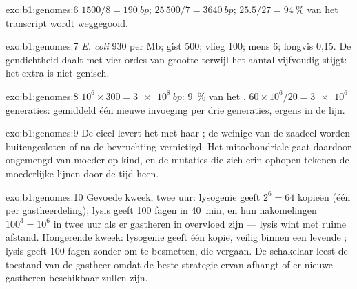 \begin{solution}{exo:b1:genomes:6}
 $1500/8 = \qty{190}{bp}$;  $25\,500/7 = \qty{3640}{bp}$;
$25.5/27 = \qty{94}{\%}$ van het transcript wordt weggegooid.
\end{solution}

\begin{solution}{exo:b1:genomes:7}
\emph{E. coli} 930  per Mb; gist 500; vlieg 100; mens 6; longvis 0,15. De
gendichtheid daalt met vier ordes van grootte terwijl het aantal  vijfvoudig
stijgt: het extra  is niet-genisch.
\end{solution}

\begin{solution}{exo:b1:genomes:8}
$10^6\times 300 = \qty{3e8}{bp}$: \qty{9}{\%} van het . $60\times
10^6/20 = \num{3e6}$ generaties: gemiddeld één nieuwe invoeging per drie
generaties, ergens in de lijn.
\end{solution}

\begin{solution}{exo:b1:genomes:9}
De eicel levert het  met haar ; de weinige  van
de zaadcel worden buitengesloten of na de bevruchting vernietigd. Het
mitochondriale  gaat daardoor ongemengd van moeder op kind, en de mutaties die
zich erin ophopen tekenen de moederlijke lijnen door de tijd heen.
\end{solution}

\begin{solution}{exo:b1:genomes:10}
Gevoede kweek, twee uur: lysogenie geeft $2^6 = 64$ kopieën (één per gastheerdeling);
lysis geeft 100 fagen in \qty{40}{min}, en hun nakomelingen $100^3 = 10^6$ in twee
uur als er gastheren in overvloed zijn --- lysis wint met ruime afstand. Hongerende
kweek: lysogenie geeft één kopie, veilig binnen een levende ; lysis geeft 100
fagen zonder  om te besmetten, die vergaan. De schakelaar leest de toestand van
de gastheer omdat de beste strategie ervan afhangt of er nieuwe gastheren
beschikbaar zullen zijn.
\end{solution}

